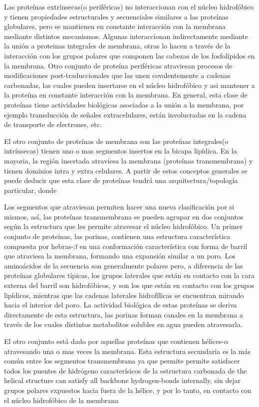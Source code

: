 Las proteínas extrínsecas(o periféricas) no interaccionan con el núcleo hidrofóbico y tienen propiedades estructurales y secuenciales similares a las proteínas globulares, 
pero se mantienen en constante interacción con la membrana mediante distintos mecanismos.
Algunas interaccionan indirectamente mediante la unión a proteinas integrales de membrana, otras lo hacen a través de la interacción con los grupos polares que componen las cabezas de los fosfolípidos en la membrana. 
Otro conjunto de proteína periféricas atraviesan procesos de modificaciones post-traduccionales que las unen covalentemente a cadenas carbonadas, las cuales pueden insertarse en el núcleo hidrofóbico y
asi mantener a la proteína en constante interacción con la membrana.
En general, esta clase de proteínas tiene actividades biológicas asociadas a la unión a la membrana, por ejemplo transducción de señales extracelulares, están involucradas en la cadena de transporte de electrones, etc.

El otro conjunto de proteínas de membrana son las proteínas integrales(o intrínsecas) tienen uno o mas segmentos insertos en la bicapa lipídica.
En la mayoria, la región insertada atraviesa la membrana (proteínas transmembrana) y tienen dominios intra y extra celulares.
A partir de estos conceptos generales se puede deducir que esta clase de proteínas tendrá una arquitectura/topología particular, donde 

Los segmentos que atraviesan permiten hacer una nueva clasificación por si mismos, así, las proteínas transmembrana se pueden agrupar en dos conjuntos según la estructura que les permite atravesar el núcleo hidrofóbico.
Un primer conjunto de proteínas, las porinas, contienen una estructura característica compuesta por hebras-$\beta$ en una conformación característica con forma de barril que atraviesa la membrana, formando una expansión similar a un poro.
Los aminoácidos de la secuencia son generalmente polares pero, a diferencia de las proteínas globulares típicas, los grupos laterales que están en contacto con la cara externa del barril son hidrofóbicos, y son los que están en contacto con 
los grupos lipídicos, mientras que las cadenas laterales hidrofílicas se encuentran mirando hacia el interior del poro.
La actividad biológica de estas proteínas se deriva directamente de esta estructura, las porinas forman canales en la membrana a través de los cuales distintos metabolitos solubles en agua pueden atravesarla. 

El otro conjunto está dado por aquellas proteínas que contienen hélices-$\alpha$ atravesando una o mas veces la membrana. 
Esta estructura secundaria es la más común entre los segmentos transmembrana ya que permite permite satisfacer todos los puentes de hidrógeno caracterísicos de la estructura carbonada de
the helical structure can satisfy all backbone hydrogen-bonds internally, 
sin dejar grupos polares expuestos hacia fuera de la hélice, y por lo tanto, en contacto con el núcleo hidrofóbico de la membrana

